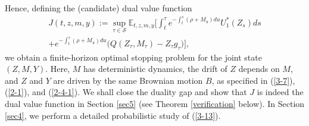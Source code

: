 \documentclass[a4paper,11pt]{amsart}
\numberwithin{equation}{section}
\newtheorem{theorem}{Theorem}[section]
\newcommand{\blue}[1]{{\color{black}#1}}
\begin{document}
Hence, defining the (candidate) dual value function
\begin{align}\label{3-13}
J(t,z,m,y):=\sup_{\tau \in\mathcal{S}
} \mathbb{E}_{t,z,m,y}\bigg[    \int_t^{\tau }  e^{-\int^s_t (\rho+ M_u) du}{U}^\ast_1(Z_s) ds \nonumber\\ + e^{-\int^{\tau}_t (\rho+ M_u) du}\Big(Q( Z_{\tau}, M_{\tau})-Z_{\tau}g_\tau \Big)\bigg],
\end{align}
\blue{we obtain a finite-horizon optimal stopping problem for the joint state $(Z,M,Y)$. Here, $M$ has deterministic dynamics, the drift of $Z$ depends on $M$, and $Z$ and $Y$ are driven by the same Brownian motion $B$, as specified in (\ref{3-7}), (\ref{2-1}), and (\ref{2-4-1}).} We shall close the duality gap and show that $J$ is indeed the dual value function in Section \ref{sec5} (see Theorem \ref{verification} below). In Section \ref{sec4}, we perform a detailed probabilistic study of (\ref{3-13}). 

 

\end{document}
